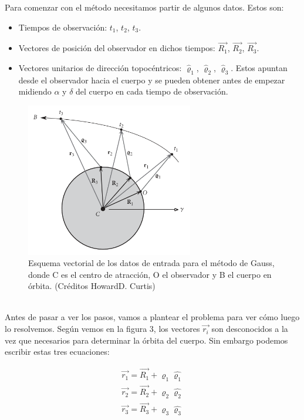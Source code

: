 \documentclass{article}
\numberwithin{equation}{section}
\begin{document}
Para comenzar con el método necesitamos partir de algunos datos. Estos son:

\begin{itemize}
    \item Tiempos de observación: $t_1$, $t_2$, $t_3$.
    \item Vectores de posición del observador en dichos tiempos: $\overrightarrow{R_1}$, $\overrightarrow{R_2}$, $\overrightarrow{R_3}$.
            \item Vectores unitarios de dirección topocéntricos: $\hat{\mathbf{\varrho}}_1$, $\hat{\mathbf{\varrho}}_2$, $\hat{\mathbf{\varrho}}_3$. Estos apuntan desde el observador hacia el cuerpo y se pueden obtener antes de empezar midiendo $\alpha$ y $\delta$ del cuerpo en cada tiempo de observación.
\end{itemize}

\begin{figure}[h]
    \centering
    \includegraphics[width=0.65\textwidth]{entra.png}
    \caption{Esquema vectorial de los datos de entrada para el método de Gauss, donde C es el centro de atracción, O el observador y B el cuerpo en órbita. (Créditos 
    HowardD. Curtis)}
\end{figure} \\

\newpage
Antes de pasar a ver los pasos, vamos a plantear el problema para ver cómo luego lo resolvemos. Según vemos en la figura 3, los vectores $\overrightarrow{r_i}$ son desconocidos a la vez que necesarios para determinar la órbita del cuerpo. Sin embargo podemos escribir estas tres ecuaciones:\par

\begin{align}
    \overrightarrow{r_1} = \overrightarrow{R_1} + \varrho_1 \hat{\varrho_1} \\
    \overrightarrow{r_2} = \overrightarrow{R_2} + \varrho_2 \hat{\varrho_2} \\
    \overrightarrow{r_3} = \overrightarrow{R_3} + \varrho_3 \hat{\varrho_3}
\end{align}
\end{document}
